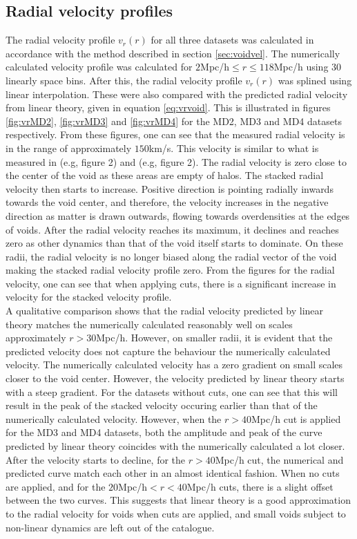 \subsection{Radial velocity profiles}
The radial velocity profile $v_r(r)$ for all three datasets was calculated in accordance with the method described in section \ref{sec:voidvel}. The numerically calculated velocity profile was calculated for $2$Mpc/h$\leq r\leq 118$Mpc/h using $30$ linearly space bins. After this, the radial velocity profile $v_r(r)$ was splined using linear interpolation. These were also compared with the predicted radial velocity from linear theory, given in equation \ref{eq:vrvoid}. This is illustrated in figures \ref{fig:vrMD2}, \ref{fig:vrMD3} and \ref{fig:vrMD4} for the MD2, MD3 and MD4 datasets respectively. From these figures, one can see that the measured radial velocity is in the range of approximately $150$km/s. This velocity is similar to what is measured in \cite{Nadathur_2018} (e.g, figure 2) and \cite{Achitouv_streaming} (e.g, figure 2). The radial velocity is zero close to the center of the void as these areas are empty of halos. The stacked radial velocity then starts to increase. Positive direction is pointing radially inwards towards the void center, and therefore, the velocity increases in the negative direction as matter is drawn outwards, flowing towards overdensities at the edges of voids. After the radial velocity reaches its maximum, it declines and reaches zero as other dynamics than that of the void itself starts to dominate. On these radii, the radial velocity is no longer biased along the radial vector of the void making the stacked radial velocity profile zero. From the figures for the radial velocity, one can see that when applying cuts, there is a significant increase in velocity for the stacked velocity profile. \\\indent
A qualitative comparison shows that the radial velocity predicted by linear theory matches the numerically calculated reasonably well on scales approximately $r>30$Mpc/h. However, on smaller radii, it is evident that the predicted velocity does not capture the behaviour the numerically calculated velocity. The numerically calculated velocity has a zero gradient on small scales closer to the void center. However, the velocity predicted by linear theory starts with a steep gradient. For the datasets without cuts, one can see that this will result in the peak of the stacked velocity occuring earlier than that of the numerically calculated velocity. However, when the $r>40$Mpc/h cut is applied for the MD3 and MD4 datasets, both the amplitude and peak of the curve predicted by linear theory coincides with the numerically calculated a lot closer. After the velocity starts to decline, for the $r>40$Mpc/h cut, the numerical and predicted curve match each other in an almost identical fashion. When no cuts are applied, and for the $20$Mpc/h$<r<40$Mpc/h cuts, there is a slight offset between the two curves. This suggests that linear theory is a good approximation to the radial velocity for voids when cuts are applied, and small voids subject to non-linear dynamics are left out of the catalogue.\\\indent
